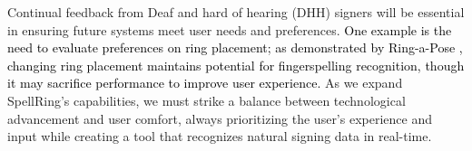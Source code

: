 Continual feedback from Deaf and hard of hearing (DHH) signers will be essential in ensuring future systems meet user needs and preferences. \textcolor{black}{One example is the need to evaluate preferences on ring placement; as demonstrated by Ring-a-Pose \cite{yu2024ring}, changing ring placement maintains potential for fingerspelling recognition, though it may sacrifice performance to improve user experience.}
As we expand SpellRing’s capabilities, we must strike a balance between technological advancement and user comfort, always prioritizing the user's experience and input while creating a tool that recognizes natural signing data in real-time.


